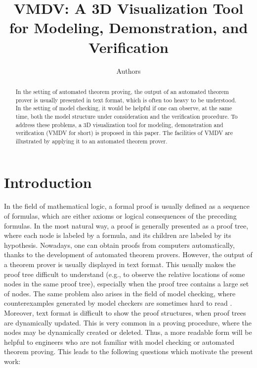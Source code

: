 \documentclass[runningheads]{llncs}
\newcommand\tool[1]{\textsf{#1}}
\newcommand\vmdv{\tool{VMDV}}
\newcommand\couic[1]{}
\begin{document}
	
\title{\vmdv: A 3D Visualization Tool for Modeling, Demonstration, and Verification}

\couic{\author{
       \IEEEauthorblockN{Jian Liu\IEEEauthorrefmark{1}\IEEEauthorrefmark{2},
       Ying Jiang\IEEEauthorrefmark{1} and
       Yanyun Chen\IEEEauthorrefmark{1}}
}}

\author{Authors}

\maketitle

\begin{abstract}
In the setting of automated theorem proving,
the output of an automated theorem prover is usually presented in text format,
which is often too heavy to be understood. 
In the setting of model checking, 
it would be helpful if one can observe, at the same time, 
both the model structure under consideration and the verification procedure. 
To address these problems, 
a 3D visualization tool for modeling, demonstration and verification (\vmdv{} for short) is proposed in this paper. 
The facilities of \vmdv{} are illustrated by applying it to an automated theorem prover.


\end{abstract}

\section{Introduction}
In the field of mathematical logic, a formal proof is usually defined as a sequence of formulas,
which are either axioms or logical consequences of the preceding formulas. 
In the most natural way, a proof is generally presented as a proof tree, where
each node is labeled by a formula, and its children are labeled by its hypothesis. 
Nowadays, one can obtain proofs from computers automatically,
thanks to the development of automated theorem provers. 
However, the output of a theorem prover is usually displayed in text format. 
This usually makes the proof tree difficult to understand 
(e.g., to observe the relative locations of some nodes in the same proof tree), 
especially when the proof tree contains a large set of nodes. 
The same problem also arises in the field of model checking, 
where counterexamples generated by model checkers are sometimes hard to read \cite{CBJPK,CGP01,CGMZ}. 
Moreover, text format is difficult to show the proof structures, when proof trees are dynamically updated. 
This is very common in a proving procedure, where the nodes may be dynamically created or deleted.
Thus, 
a more readable form will be helpful to engineers who are not familiar with model checking or automated theorem proving. 
This leads to the following questions which motivate the present work: 
\end{document}
